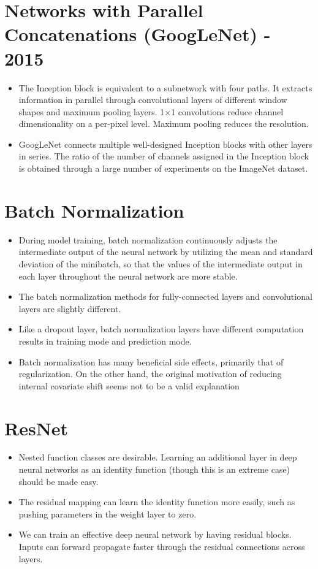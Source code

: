 \documentclass[12pt,notitlepage]{article}
\begin{document}
\section{ Networks with Parallel Concatenations (GoogLeNet) - 2015 }
\begin{itemize}
  \item The Inception block is equivalent to a subnetwork with four paths. It extracts information in parallel through convolutional layers of different window shapes and maximum pooling layers.  1×1  convolutions reduce channel dimensionality on a per-pixel level. Maximum pooling reduces the resolution.
  \item GoogLeNet connects multiple well-designed Inception blocks with other layers in series. The ratio of the number of channels assigned in the Inception block is obtained through a large number of experiments on the ImageNet dataset.
\end{itemize}

\section{Batch Normalization}
\begin{itemize}
  \item During model training, batch normalization continuously adjusts the intermediate output of the neural network by utilizing the mean and standard deviation of the minibatch, so that the values of the intermediate output in each layer throughout the neural network are more stable.
  \item The batch normalization methods for fully-connected layers and convolutional layers are slightly different.
  \item Like a dropout layer, batch normalization layers have different computation results in training mode and prediction mode.
  \item Batch normalization has many beneficial side effects, primarily that of regularization. On the other hand, the original motivation of reducing internal covariate shift seems not to be a valid explanation
\end{itemize}

\section{ResNet}
\begin{itemize}
  \item Nested function classes are desirable. Learning an additional layer in deep neural networks as an identity function (though this is an extreme case) should be made easy.
  \item The residual mapping can learn the identity function more easily, such as pushing parameters in the weight layer to zero.
  \item We can train an effective deep neural network by having residual blocks. Inputs can forward propagate faster through the residual connections across layers.
\end{itemize}
\end{document}
